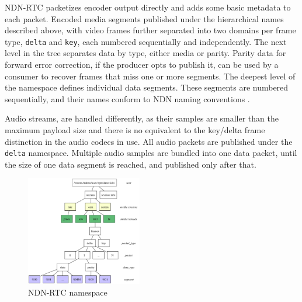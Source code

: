 \documentclass{icn/sig-alternate-2012} %
\newcommand{\ndnrtcName}{NDN-RTC} %
\begin{document}

\ndnrtcName{} packetizes encoder output directly and adds some basic metadata to each packet. Encoded media segments published under the hierarchical names described above, with video frames further separated into two domains per frame type, \texttt{delta} and \texttt{key}, each numbered sequentially and independently.  The next level in the tree separates data by type, either media or parity. Parity data for forward error correction, if the producer opts to publish it, can be used by a consumer to recover frames that miss one or more segments. 
The deepest level of the namespace defines individual data segments. These segments are numbered sequentially, and their names conform to NDN naming conventions \cite{ndnnaming}.

Audio streams, are handled differently, as their samples are smaller than the maximum payload size and there is no equivalent to the key/delta frame distinction in the audio codecs in use. All audio packets are published under the \texttt{delta} namespace. Multiple audio samples are bundled into one data packet, until the size of one data segment is reached, and published only after that.

\begin{figure}[t!]
\centering
\includegraphics[width=0.45\textwidth]{namespace}
\caption{\ndnrtcName{} namespace}
\label{fig:namespace}
\end{figure}
\end{document}
